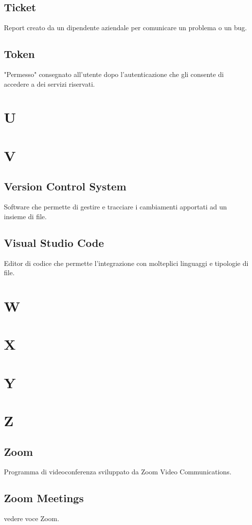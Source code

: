 \subsection{Ticket}
Report creato da un dipendente aziendale per comunicare un problema o un bug.
\subsection{Token}  
"Permesso" consegnato all'utente dopo l'autenticazione che gli consente di accedere a dei servizi riservati.
\newpage
\section{U}
\section{V}
\subsection{Version Control System}
Software che permette di gestire e tracciare i cambiamenti apportati ad un insieme di file.
\subsection{Visual Studio Code}
Editor di codice che permette l'integrazione con molteplici linguaggi e tipologie di file.
\newpage
\section{W}
\section{X}
\section{Y}
\section{Z}
\subsection{Zoom}
Programma di videoconferenza sviluppato da Zoom Video Communications.
\subsection{Zoom Meetings}
vedere voce Zoom.

